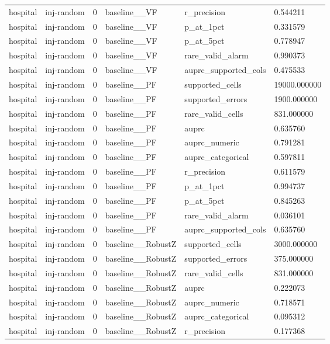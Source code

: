 \begin{tabular}{llllll}
hospital & inj-random & 0 & baseline\_\_VF & r\_precision & 0.544211 \\
hospital & inj-random & 0 & baseline\_\_VF & p\_at\_1pct & 0.331579 \\
hospital & inj-random & 0 & baseline\_\_VF & p\_at\_5pct & 0.778947 \\
hospital & inj-random & 0 & baseline\_\_VF & rare\_valid\_alarm & 0.990373 \\
hospital & inj-random & 0 & baseline\_\_VF & auprc\_supported\_cols & 0.475533 \\
hospital & inj-random & 0 & baseline\_\_PF & supported\_cells & 19000.000000 \\
hospital & inj-random & 0 & baseline\_\_PF & supported\_errors & 1900.000000 \\
hospital & inj-random & 0 & baseline\_\_PF & rare\_valid\_cells & 831.000000 \\
hospital & inj-random & 0 & baseline\_\_PF & auprc & 0.635760 \\
hospital & inj-random & 0 & baseline\_\_PF & auprc\_numeric & 0.791281 \\
hospital & inj-random & 0 & baseline\_\_PF & auprc\_categorical & 0.597811 \\
hospital & inj-random & 0 & baseline\_\_PF & r\_precision & 0.611579 \\
hospital & inj-random & 0 & baseline\_\_PF & p\_at\_1pct & 0.994737 \\
hospital & inj-random & 0 & baseline\_\_PF & p\_at\_5pct & 0.845263 \\
hospital & inj-random & 0 & baseline\_\_PF & rare\_valid\_alarm & 0.036101 \\
hospital & inj-random & 0 & baseline\_\_PF & auprc\_supported\_cols & 0.635760 \\
hospital & inj-random & 0 & baseline\_\_RobustZ & supported\_cells & 3000.000000 \\
hospital & inj-random & 0 & baseline\_\_RobustZ & supported\_errors & 375.000000 \\
hospital & inj-random & 0 & baseline\_\_RobustZ & rare\_valid\_cells & 831.000000 \\
hospital & inj-random & 0 & baseline\_\_RobustZ & auprc & 0.222073 \\
hospital & inj-random & 0 & baseline\_\_RobustZ & auprc\_numeric & 0.718571 \\
hospital & inj-random & 0 & baseline\_\_RobustZ & auprc\_categorical & 0.095312 \\
hospital & inj-random & 0 & baseline\_\_RobustZ & r\_precision & 0.177368 \\

\end{tabular}
